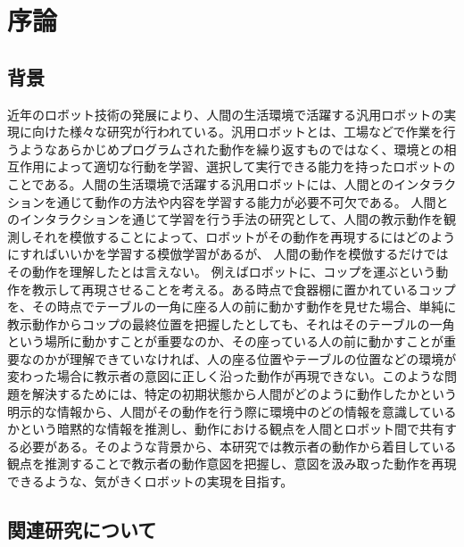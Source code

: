 ﻿%
\chapter{序論}

\section{背景}

近年のロボット技術の発展により、人間の生活環境で活躍する汎用ロボットの実現に向けた様々な研究が行われている。汎用ロボットとは、工場などで作業を行うようなあらかじめプログラムされた動作を繰り返すものではなく、環境との相互作用によって適切な行動を学習、選択して実行できる能力を持ったロボットのことである。人間の生活環境で活躍する汎用ロボットには、人間とのインタラクションを通じて動作の方法や内容を学習する能力が必要不可欠である。
人間とのインタラクションを通じて学習を行う手法の研究として、人間の教示動作を観測しそれを模倣することによって、ロボットがその動作を再現するにはどのようにすればいいかを学習する模倣学習があるが、
人間の動作を模倣するだけではその動作を理解したとは言えない。
例えばロボットに、コップを運ぶという動作を教示して再現させることを考える。ある時点で食器棚に置かれているコップを、その時点でテーブルの一角に座る人の前に動かす動作を見せた場合、単純に教示動作からコップの最終位置を把握したとしても、それはそのテーブルの一角という場所に動かすことが重要なのか、その座っている人の前に動かすことが重要なのかが理解できていなければ、人の座る位置やテーブルの位置などの環境が変わった場合に教示者の意図に正しく沿った動作が再現できない。このような問題を解決するためには、特定の初期状態から人間がどのように動作したかという明示的な情報から、人間がその動作を行う際に環境中のどの情報を意識しているかという暗黙的な情報を推測し、動作における観点を人間とロボット間で共有する必要がある。そのような背景から、本研究では教示者の動作から着目している観点を推測することで教示者の動作意図を把握し、意図を汲み取った動作を再現できるような、気がきくロボットの実現を目指す。

\section{関連研究について}

